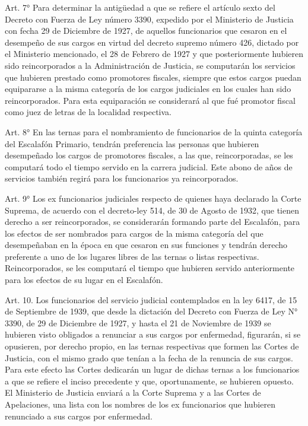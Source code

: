     Art. 7° Para determinar la antigüedad a que se refiere el artículo sexto del Decreto con Fuerza de Ley número 3390, expedido por el Ministerio de Justicia con fecha 29 de Diciembre de 1927, de aquellos funcionarios que cesaron en el desempeño de sus cargos en virtud del decreto supremo número 426, dictado por el Ministerio mencionado, el 28 de Febrero de 1927 y que posteriormente hubieren sido reincorporados a la Administración de Justicia, se computarán los servicios que hubieren prestado como promotores fiscales, siempre que estos cargos puedan equipararse a la misma categoría de los cargos judiciales en los cuales han sido reincorporados. Para esta equiparación se considerará al que fué promotor fiscal como juez de letras de la localidad respectiva.




    Art. 8° En las ternas para el nombramiento de funcionarios de la quinta categoría del Escalafón Primario, tendrán preferencia las personas que hubieren desempeñado los cargos de promotores fiscales, a las que, reincorporadas, se les computará todo el tiempo servido en la carrera judicial.
    Este abono de años de servicios también regirá para los funcionarios ya reincorporados.



    Art. 9° Los ex funcionarios judiciales respecto de quienes haya declarado la Corte Suprema, de acuerdo con el decreto-ley 514, de 30 de Agosto de 1932, que tienen derecho a ser reincorporados, se considerarán formando parte del Escalafón, para los efectos de ser nombrados para cargos de la misma categoría del que desempeñaban en la época en que cesaron en sus funciones y tendrán derecho preferente a uno de los lugares libres de las ternas o listas respectivas. Reincorporados, se les computará el tiempo que hubieren servido anteriormente para los efectos de su lugar en el Escalafón.


    Art. 10. Los funcionarios del servicio judicial contemplados en la ley 6417, de 15 de Septiembre de 1939, que desde la dictación del Decreto con Fuerza de Ley N° 3390, de 29 de Diciembre de 1927, y hasta el 21 de Noviembre de 1939 se hubieren visto obligados a renunciar a sus cargos por enfermedad, figurarán, si se opusieren, por derecho propio, en las ternas respectivas que formen las Cortes de Justicia, con el mismo grado que tenían a la fecha de la renuncia de sus cargos.
    Para este efecto las Cortes dedicarán un lugar de dichas ternas a los funcionarios a que se refiere el inciso precedente y que, oportunamente, se hubieren opuesto.
    El Ministerio de Justicia enviará a la Corte Suprema y a las Cortes de Apelaciones, una lista con los nombres de los ex funcionarios que hubieren renunciado a sus cargos por enfermedad.


